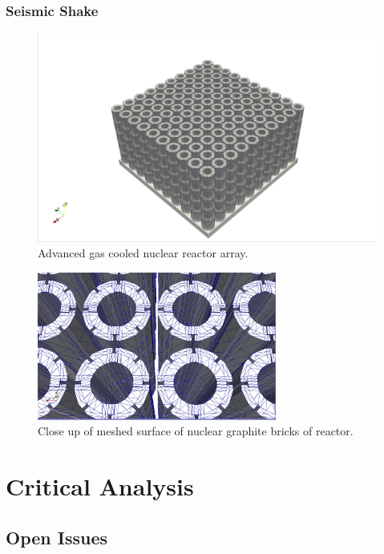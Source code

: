 \documentclass[times,12pt]{article}
\begin{document}
\subsubsection{Seismic Shake}
\begin{figure}[!h]
\centering
\includegraphics[width=1\textwidth]{sketches/nuclear} \protect\caption{\label{nuclear}Advanced gas cooled nuclear reactor array.}
\end{figure}

\begin{figure}[!h]
\centering
\includegraphics[width=0.7\textwidth]{sketches/nuclearcloseup} \protect\caption{\label{nuclearcloseup}Close up of meshed surface of nuclear graphite bricks of reactor.}
\end{figure}


\section{Critical Analysis}

\subsection{Open Issues}
\end{document}

